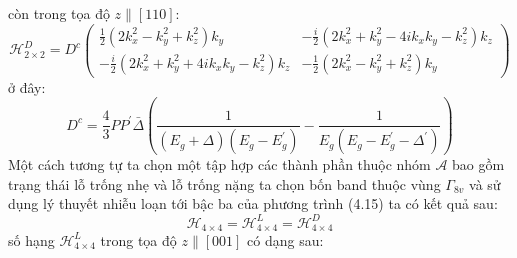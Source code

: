 còn trong tọa độ $z\parallel[110]$:
\begin{equation}
\mathcal{H}_{2\times2}^{D} = D^{c}\begin{pmatrix}
\frac{1}{2}(2k_x^2 -k_y^2 +k_z^2)k_y &-\frac{i}{2}(2k_x^2 +k_y^2 -4ik_xk_y -k_z^2)k_z\\
-\frac{i}{2}(2k_x^2 +k_y^2 +4ik_xk_y -k_z^2)k_z &-\frac{1}{2}(2k_x^2 -k_y^2 +k_z^2)k_y
\end{pmatrix}
\end{equation}
ở đây:
\begin{equation}
D^c =\frac{4}{3}PP^{'}\bar{\Delta}\left(\frac{1}{(E_g +\Delta)(E_g -E_g^{'})} -\frac{1}{E_g(E_g -E_g^{'} -\Delta^{'})}\right)
\end{equation}
Một cách tương tự ta chọn một tập hợp các thành phần thuộc nhóm $\mathcal{A}$ bao gồm trạng thái lỗ trống nhẹ và lỗ trống nặng ta chọn bốn band thuộc vùng $\Gamma_{8v}$ và sử dụng lý thuyết nhiễu loạn tới bậc ba của phương trình (4.15) ta có kết quả sau:
\begin{equation}
\mathcal{H}_{4\times4} =\mathcal{H}_{4\times4}^L =\mathcal{H}_{4\times4}^D
\end{equation}
số hạng $\mathcal{H}_{4\times4}^L$ trong tọa độ $z\parallel[001]$ có dạng sau:
